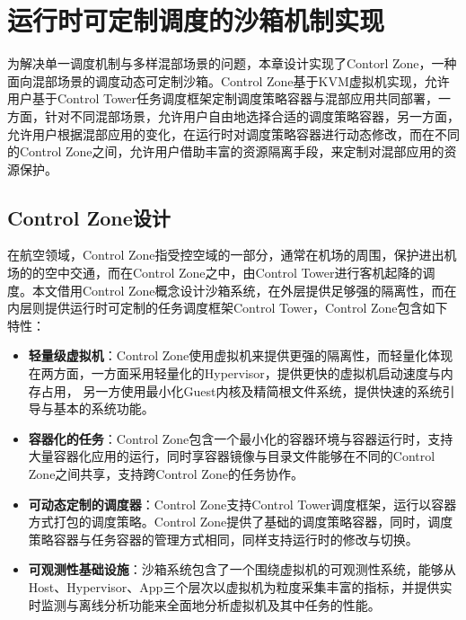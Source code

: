 \chapter{运行时可定制调度的沙箱机制实现}\label{chap:control_zone}

为解决单一调度机制与多样混部场景的问题，本章设计实现了Contorl Zone，一种面向混部场景的调度动态可定制沙箱。Control Zone基于KVM虚拟机实现，允许用户基于Control Tower任务调度框架定制调度策略容器与混部应用共同部署，一方面，针对不同混部场景，允许用户自由地选择合适的调度策略容器，另一方面，允许用户根据混部应用的变化，在运行时对调度策略容器进行动态修改，而在不同的Control Zone之间，允许用户借助丰富的资源隔离手段，来定制对混部应用的资源保护。

\section{Control Zone设计}



在航空领域，Control Zone指受控空域的一部分，通常在机场的周围，保护进出机场的的空中交通，而在Control Zone之中，由Control Tower进行客机起降的调度。本文借用Control Zone概念设计沙箱系统，在外层提供足够强的隔离性，而在内层则提供运行时可定制的任务调度框架Control Tower，Control Zone包含如下特性：

\begin{itemize}
    \item \textbf{轻量级虚拟机}：Control Zone使用虚拟机来提供更强的隔离性，而轻量化体现在两方面，一方面采用轻量化的Hypervisor，提供更快的虚拟机启动速度与内存占用， 另一方使用最小化Guest内核及精简根文件系统，提供快速的系统引导与基本的系统功能。
    \item \textbf{容器化的任务}：Control Zone包含一个最小化的容器环境与容器运行时，支持大量容器化应用的运行，同时享容器镜像与目录文件能够在不同的Control Zone之间共享，支持跨Control Zone的任务协作。
    \item \textbf{可动态定制的调度器}：Control Zone支持Control Tower调度框架，运行以容器方式打包的调度策略。Control Zone提供了基础的调度策略容器，同时，调度策略容器与任务容器的管理方式相同，同样支持运行时的修改与切换。
    \item \textbf{可观测性基础设施}：沙箱系统包含了一个围绕虚拟机的可观测性系统，能够从Host、Hypervisor、App三个层次以虚拟机为粒度采集丰富的指标，并提供实时监测与离线分析功能来全面地分析虚拟机及其中任务的性能。
\end{itemize}


